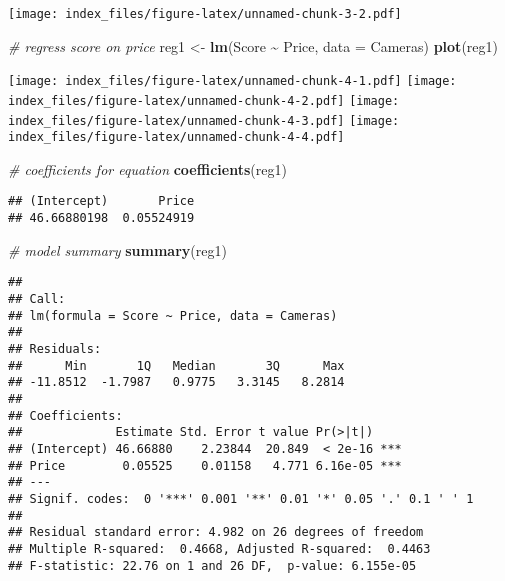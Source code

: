 \documentclass[
]{article}
\newenvironment{Shaded}{\begin{snugshade}}{\end{snugshade}}
\newcommand{\AttributeTok}[1]{\textcolor[rgb]{0.13,0.29,0.53}{#1}}
\newcommand{\CommentTok}[1]{\textcolor[rgb]{0.56,0.35,0.01}{\textit{#1}}}
\newcommand{\FunctionTok}[1]{\textcolor[rgb]{0.13,0.29,0.53}{\textbf{#1}}}
\newcommand{\NormalTok}[1]{#1}
\newcommand{\OtherTok}[1]{\textcolor[rgb]{0.56,0.35,0.01}{#1}}
\newcommand{\SpecialCharTok}[1]{\textcolor[rgb]{0.81,0.36,0.00}{\textbf{#1}}}
\begin{document}
\texttt{[image: index\_files/figure-latex/unnamed-chunk-3-2.pdf]}

\begin{Shaded}
\begin{Highlighting}[]
\CommentTok{\# regress score on price}
\NormalTok{reg1 }\OtherTok{\textless{}{-}} \FunctionTok{lm}\NormalTok{(Score }\SpecialCharTok{\textasciitilde{}}\NormalTok{ Price, }\AttributeTok{data =}\NormalTok{ Cameras) }
\FunctionTok{plot}\NormalTok{(reg1)}
\end{Highlighting}
\end{Shaded}

\texttt{[image: index\_files/figure-latex/unnamed-chunk-4-1.pdf]}
\texttt{[image: index\_files/figure-latex/unnamed-chunk-4-2.pdf]}
\texttt{[image: index\_files/figure-latex/unnamed-chunk-4-3.pdf]}
\texttt{[image: index\_files/figure-latex/unnamed-chunk-4-4.pdf]}

\begin{Shaded}
\begin{Highlighting}[]
\CommentTok{\# coefficients for equation}
\FunctionTok{coefficients}\NormalTok{(reg1)}
\end{Highlighting}
\end{Shaded}

\begin{verbatim}
## (Intercept)       Price 
## 46.66880198  0.05524919
\end{verbatim}

\begin{Shaded}
\begin{Highlighting}[]
\CommentTok{\# model summary}
\FunctionTok{summary}\NormalTok{(reg1)}
\end{Highlighting}
\end{Shaded}

\begin{verbatim}
## 
## Call:
## lm(formula = Score ~ Price, data = Cameras)
## 
## Residuals:
##      Min       1Q   Median       3Q      Max 
## -11.8512  -1.7987   0.9775   3.3145   8.2814 
## 
## Coefficients:
##             Estimate Std. Error t value Pr(>|t|)    
## (Intercept) 46.66880    2.23844  20.849  < 2e-16 ***
## Price        0.05525    0.01158   4.771 6.16e-05 ***
## ---
## Signif. codes:  0 '***' 0.001 '**' 0.01 '*' 0.05 '.' 0.1 ' ' 1
## 
## Residual standard error: 4.982 on 26 degrees of freedom
## Multiple R-squared:  0.4668, Adjusted R-squared:  0.4463 
## F-statistic: 22.76 on 1 and 26 DF,  p-value: 6.155e-05
\end{verbatim}
\end{document}
